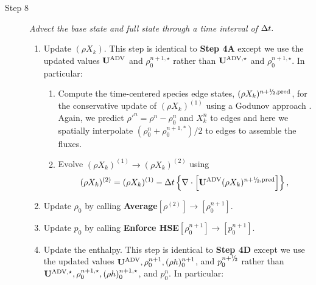 \begin{description}
\item[Step 8] {\em Advect the base state and full state through a time interval of $\Delta t.$}

\begin{enumerate}
\renewcommand{\theenumi}{{\bf \Alph{enumi}}}

\item Update $(\rho X_k)$.  This step is identical to {\bf Step 4A} except we use
  the updated values ${\bf{U}}^{\mathrm{ADV}}$ and $\rho_0^{n+1,\star}$ rather than
  ${\bf{U}}^{\mathrm{ADV},\star}$ and $\rho_0^{n+1,\star}$.  In particular:

\begin{enumerate}
\renewcommand{\labelenumii}{{\bf \roman{enumii}}.}

\item Compute the time-centered species edge states, $(\rho X_k)^{\nph,\pred}$,
  for the conservative update of $(\rho X_k)^{(1)}$ using a Godunov approach \citep{XRB_III}.
  Again, we predict $\rho'^n=\rho^n-\rho_0^n$ and $X_k^n$ to edges
  and here we spatially interpolate $(\rho_0^n+\rho_0^{n+1,*})/2$ to edges to assemble the fluxes.


\item Evolve $(\rho X_k)^{(1)} \rightarrow (\rho X_k)^{(2)}$ using
\begin{equation}
(\rho X_k)^{(2)} = (\rho X_k)^{(1)}
- \dt \left\{ \nabla \cdot \left[\uadvtwo (\rho X_k)^{\nph,\pred} \right] \right\},
\end{equation}

\end{enumerate}

\item Update $\rho_0$ by calling {\bf Average}$[\rho^{(2)}]\rightarrow[\rho_0^{n+1}]$.

\item Update $p_0$ by calling {\bf Enforce HSE}$[\rho_0^{n+1}] \rightarrow [p_0^{n+1}]$.

\item Update the enthalpy.  This step is identical to {\bf Step 4D} except we use
  the updated values ${\bf{U}}^{\mathrm{ADV}}, \rho_0^{n+1}, (\rho h)_0^{n+1}$, and $p_0^{\nph}$
  rather than
  ${\bf{U}}^{\mathrm{ADV},\star}, \rho_0^{n+1,\star}, (\rho h)_0^{n+1,\star}$, and $p_0^n$.
  In particular:

\begin{enumerate}
\renewcommand{\labelenumii}{{\bf \roman{enumii}}.}


\end{enumerate}
\end{enumerate}
\end{description}
